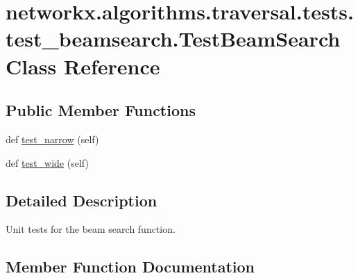 \hypertarget{classnetworkx_1_1algorithms_1_1traversal_1_1tests_1_1test__beamsearch_1_1TestBeamSearch}{}\section{networkx.\+algorithms.\+traversal.\+tests.\+test\+\_\+beamsearch.\+Test\+Beam\+Search Class Reference}
\label{classnetworkx_1_1algorithms_1_1traversal_1_1tests_1_1test__beamsearch_1_1TestBeamSearch}
\subsection*{Public Member Functions}
\begin{DoxyCompactItemize}
\item 
def \hyperlink{classnetworkx_1_1algorithms_1_1traversal_1_1tests_1_1test__beamsearch_1_1TestBeamSearch_ab0a5cf2fbc06c2c47561797f8fd3ed96}{test\+\_\+narrow} (self)
\item 
def \hyperlink{classnetworkx_1_1algorithms_1_1traversal_1_1tests_1_1test__beamsearch_1_1TestBeamSearch_a097676fae73d5c43791dd42318514b61}{test\+\_\+wide} (self)
\end{DoxyCompactItemize}


\subsection{Detailed Description}
\begin{DoxyVerb}Unit tests for the beam search function.\end{DoxyVerb}
 

\subsection{Member Function Documentation}
\mbox{\label{classnetworkx_1_1algorithms_1_1traversal_1_1tests_1_1test__beamsearch_1_1TestBeamSearch_ab0a5cf2fbc06c2c47561797f8fd3ed96}} 

